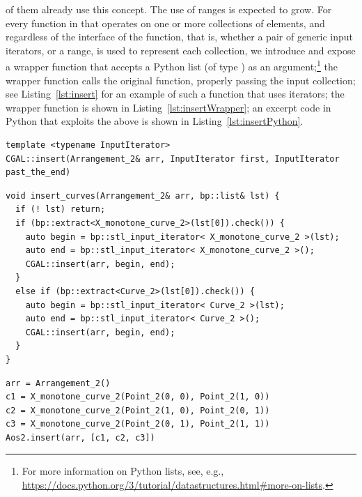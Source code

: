 of them already use this concept. The use of ranges is expected
to grow. For every function in \cgal{} that operates on one or more
collections of elements, and regardless of the interface of the
function, that is, whether a pair of generic input iterators, or a
range, is used to represent each collection, we introduce and expose a
wrapper function that accepts a Python list (of type
) as an argument;\footnote{For more information
  on Python lists, see, e.g.,
  \url{https://docs.python.org/3/tutorial/datastructures.html\#more-on-lists}.}
the wrapper function calls the original function, properly passing the
input collection; see Listing~\ref{lst:insert} for an example of such
a function that uses iterators; the wrapper function is shown in
Listing~\ref{lst:insertWrapper}; an excerpt code in Python that
exploits the above is shown in Listing~\ref{lst:insertPython}.

\begin{lstfloat}
  \begin{lstlisting}[style=cppFramedStyle,basicstyle=\normalsize,%
                     label={lst:insert},%
                     caption={The signature of the free function that inserts a collections of curves into an arrangement.}]
template <typename InputIterator>
CGAL::insert(Arrangement_2& arr, InputIterator first, InputIterator past_the_end)
  \end{lstlisting}
\end{lstfloat}

\begin{lstfloat}
  \begin{lstlisting}[style=cppFramedStyle,basicstyle=\normalsize,%
                     label={lst:insertWrapper},%
                     caption={A function that wraps the function shown in Listing~\ref{lst:insert} and accepts a Python list that contains the input curves.}]
void insert_curves(Arrangement_2& arr, bp::list& lst) {
  if (! lst) return;
  if (bp::extract<X_monotone_curve_2>(lst[0]).check()) {
    auto begin = bp::stl_input_iterator< X_monotone_curve_2 >(lst);
    auto end = bp::stl_input_iterator< X_monotone_curve_2 >();
    CGAL::insert(arr, begin, end);
  }
  else if (bp::extract<Curve_2>(lst[0]).check()) {
    auto begin = bp::stl_input_iterator< Curve_2 >(lst);
    auto end = bp::stl_input_iterator< Curve_2 >();
    CGAL::insert(arr, begin, end);
  }
}
  \end{lstlisting}
\end{lstfloat}

\begin{lstfloat}
  \begin{lstlisting}[style=pythonFramedStyle,basicstyle=\normalsize,%
                     label={lst:insertPython},%
                     caption={A code sample in Python that inserts three curves into an arrangement.}]
arr = Arrangement_2()
c1 = X_monotone_curve_2(Point_2(0, 0), Point_2(1, 0))
c2 = X_monotone_curve_2(Point_2(1, 0), Point_2(0, 1))
c3 = X_monotone_curve_2(Point_2(0, 1), Point_2(1, 1))
Aos2.insert(arr, [c1, c2, c3])
  \end{lstlisting}
\end{lstfloat}


